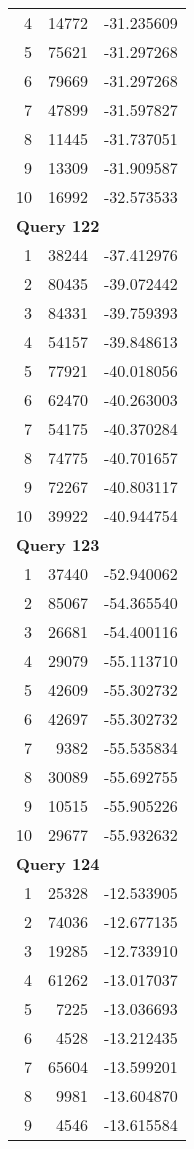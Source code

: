 \begin{longtable}[{p}]{@{}rrp{}@{}}
4 & 14772 & -31.235609 \\
5 & 75621 & -31.297268 \\
6 & 79669 & -31.297268 \\
7 & 47899 & -31.597827 \\
8 & 11445 & -31.737051 \\
9 & 13309 & -31.909587 \\
10 & 16992 & -32.573533 \\
\midrule
\multicolumn{3}{l}{\bfseries Query 122} \\
1 & 38244 & -37.412976 \\
2 & 80435 & -39.072442 \\
3 & 84331 & -39.759393 \\
4 & 54157 & -39.848613 \\
5 & 77921 & -40.018056 \\
6 & 62470 & -40.263003 \\
7 & 54175 & -40.370284 \\
8 & 74775 & -40.701657 \\
9 & 72267 & -40.803117 \\
10 & 39922 & -40.944754 \\
\midrule
\multicolumn{3}{l}{\bfseries Query 123} \\
1 & 37440 & -52.940062 \\
2 & 85067 & -54.365540 \\
3 & 26681 & -54.400116 \\
4 & 29079 & -55.113710 \\
5 & 42609 & -55.302732 \\
6 & 42697 & -55.302732 \\
7 & 9382 & -55.535834 \\
8 & 30089 & -55.692755 \\
9 & 10515 & -55.905226 \\
10 & 29677 & -55.932632 \\
\midrule
\multicolumn{3}{l}{\bfseries Query 124} \\
1 & 25328 & -12.533905 \\
2 & 74036 & -12.677135 \\
3 & 19285 & -12.733910 \\
4 & 61262 & -13.017037 \\
5 & 7225 & -13.036693 \\
6 & 4528 & -13.212435 \\
7 & 65604 & -13.599201 \\
8 & 9981 & -13.604870 \\
9 & 4546 & -13.615584 \\

\end{longtable}
